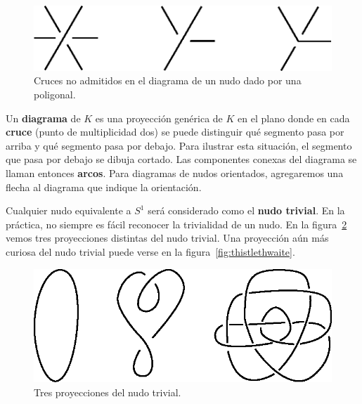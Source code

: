 \documentclass[graybox]{svmult}
\begin{document}
	\begin{figure}[ht]
        \centering
    	\includegraphics[scale=0.6]{images/wrongcrossings}
        \caption{Cruces no admitidos en el diagrama de un nudo dado por una
        poligonal.}
        \label{fig:wrong_crossings}
    \end{figure}
   
    Un \textbf{diagrama} de $K$ es una proyección genérica de $K$ en el plano
    donde en cada \textbf{cruce} (punto de multiplicidad dos) se puede
    distinguir qué segmento pasa por arriba y qué segmento pasa por debajo.
    Para ilustrar esta situación, el segmento que pasa por debajo se dibuja
    cortado.  Las componentes conexas del diagrama se llaman entonces
    \textbf{arcos}. Para diagramas de nudos orientados, agregaremos una flecha
    al diagrama que indique la orientación.

    Cualquier nudo equivalente a $S^1$ será considerado como el \textbf{nudo
    trivial}.  En la práctica, no siempre es fácil reconocer la trivialidad de
    un nudo. En la figura~\ref{fig:trivial} vemos tres proyecciones distintas
    del nudo trivial. Una proyección aún más curiosa del nudo trivial puede
    verse en la figura~\ref{fig:thistlethwaite}.

    \begin{figure}[ht]
		\centering
    	\includegraphics[scale=0.6]{images/unknots}
        \caption{Tres proyecciones del nudo trivial.}
        \label{fig:trivial}
	\end{figure}
	
\end{document}
